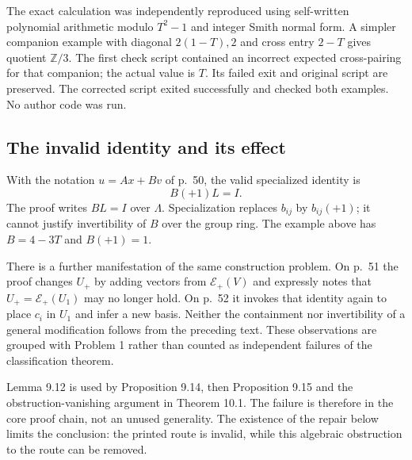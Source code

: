 \documentclass[10pt]{article}
\begin{document}
The exact calculation was independently reproduced using self-written polynomial arithmetic modulo \(T^2-1\) and integer Smith normal form. A simpler companion example with diagonal \(2(1-T),2\) and cross entry \(2-T\) gives quotient \(\mathbb Z/3\). The first check script contained an incorrect expected cross-pairing for that companion; the actual value is \(T\). Its failed exit and original script are preserved. The corrected script exited successfully and checked both examples. No author code was run.\par
\subsection*{The invalid identity and its effect}
With the notation \(u=Ax+Bv\) of p. 50, the valid specialized identity is \[B(+1)L=I.\] The proof writes \(BL=I\) over \(\Lambda\). Specialization replaces \(b_{ij}\) by \(b_{ij}(+1)\); it cannot justify invertibility of \(B\) over the group ring. The example above has \(B=4-3T\) and \(B(+1)=1\).\par
There is a further manifestation of the same construction problem. On p. 51 the proof changes \(U_+\) by adding vectors from \(\mathcal E_+(V)\) and expressly notes that \(U_+=\mathcal E_+(U_1)\) may no longer hold. On p. 52 it invokes that identity again to place \(c_i\) in \(U_1\) and infer a new basis. Neither the containment nor invertibility of a general modification follows from the preceding text. These observations are grouped with Problem 1 rather than counted as independent failures of the classification theorem.\par
Lemma 9.12 is used by Proposition 9.14, then Proposition 9.15 and the obstruction-vanishing argument in Theorem 10.1. The failure is therefore in the core proof chain, not an unused generality. The existence of the repair below limits the conclusion: the printed route is invalid, while this algebraic obstruction to the route can be removed.\par
\end{document}
